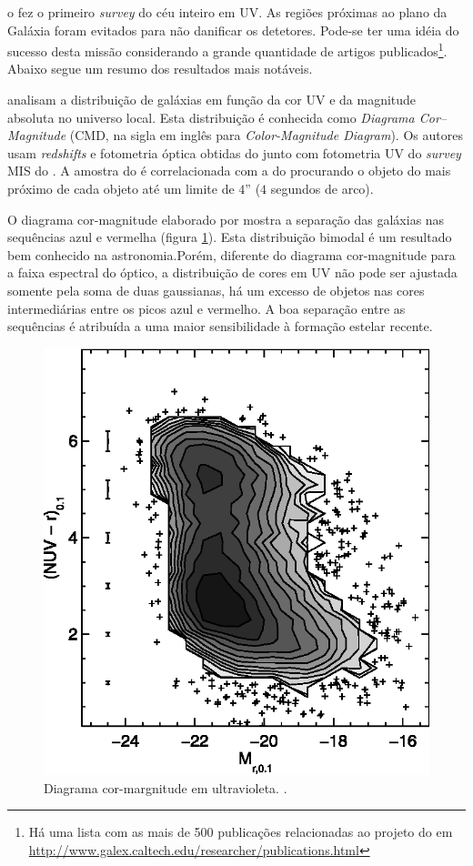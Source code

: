 o \galex fez o primeiro {\em survey} do céu inteiro em UV. As regiões próximas
ao plano da Galáxia foram evitados para não danificar os detetores. Pode-se ter
uma idéia do sucesso desta missão considerando a grande quantidade de artigos
publicados\footnote{Há uma lista com as mais de 500 publicações relacionadas ao
projeto do \galex em
\url{http://www.galex.caltech.edu/researcher/publications.html}}. Abaixo segue
um resumo dos resultados mais notáveis.

\citet{Wyder2007} analisam a distribuição de galáxias em função da cor UV e da
magnitude absoluta no universo local. Esta distribuição é conhecida como {\em
Diagrama Cor--Magnitude} (CMD, na sigla em inglês para {\em Color-Magnitude
Diagram}). Os autores usam {\em redshifts} e fotometria óptica obtidas do \SDSS
junto com fotometria UV do {\em survey} MIS do \galex. A amostra do \SDSS é
correlacionada com a do \galex procurando o objeto do \galex mais próximo de
cada objeto \SDSS até um limite de $4$'' ($4$ segundos de arco).

O diagrama cor-magnitude elaborado por \citeauthor{Wyder2007} mostra a separação
das galáxias nas sequências azul e vermelha (figura \ref{fig:WyderCMD}). Esta
distribuição bimodal é um resultado bem conhecido na astronomia.\citneed Porém,
diferente do diagrama cor-magnitude para a faixa espectral do óptico, a
distribuição de cores em UV não pode ser ajustada somente pela soma de duas
gaussianas, há um excesso de objetos nas cores intermediárias entre os picos
azul e vermelho. A boa separação entre as sequências é atribuída a uma maior
sensibilidade à formação estelar recente.

\begin{figure}
	\includegraphics[width=0.7\columnwidth]{figuras/cmd-wyder.eps}
	\caption[Diagrama cor-margnitude em ultravioleta.]
	{Diagrama cor-margnitude em ultravioleta. \citep[figura 7]{Wyder2007}.}
	\label{fig:WyderCMD}
\end{figure}

